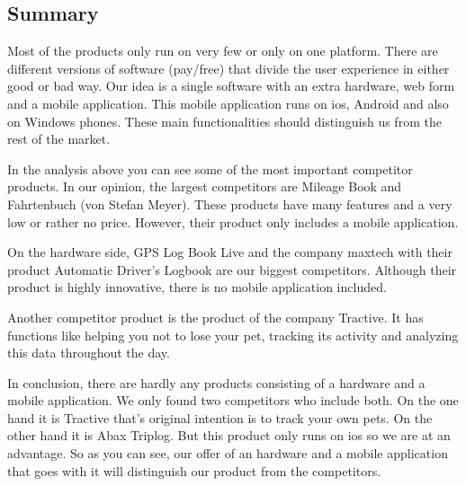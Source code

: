 \begin{singlespace}
\section{Summary}
Most of the products only run on very few or only on one platform. There are different versions of software (pay/free)  that divide the user experience in either good or bad way. Our idea is a single software with an extra hardware, web form and a mobile application. This mobile application runs on \gls{ios}, Android and also on Windows phones. These main functionalities should distinguish us from the rest of the market. 

In the analysis above you can see some of the most important competitor products. In our opinion, the largest competitors are Mileage Book and Fahrtenbuch (von Stefan Meyer). These products have many features and a very low or rather no price. However, their product only includes a mobile application.

On the hardware side, GPS Log Book Live and the company maxtech with their product Automatic Driver’s Logbook are our biggest competitors. Although their product is highly innovative, there is no mobile application included. 

Another competitor product is the product of the company Tractive. It has functions like helping you not to lose your pet, tracking its activity and analyzing this data throughout the day.

In conclusion, there are hardly any products consisting of a hardware and a mobile application. We only found two competitors who include both. On the one hand it is Tractive that's original intention is to track your own pets. On the other hand it is Abax Triplog. But this product only runs on \gls{ios} so we are at an advantage. So as you can see, our offer of an hardware and a mobile application that goes with it will distinguish our product from the competitors.
\newline\newline

\begin{tabular}{p{3cm}p{5cm}p{3cm}p{2cm}}
\toprule


\end{tabular}
\end{singlespace}

